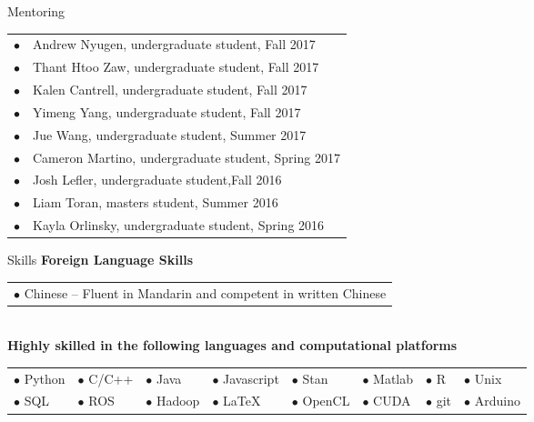 \documentclass{resume} %
\begin{document}
\begin{rSection}{Mentoring}
  \begin{tabular}{ll}
    $\bullet$  &   Andrew Nyugen, undergraduate student, Fall 2017 \\
    $\bullet$  &   Thant Htoo Zaw, undergraduate student, Fall 2017 \\
    $\bullet$  &   Kalen Cantrell, undergraduate student, Fall 2017 \\
    $\bullet$  &   Yimeng Yang, undergraduate student, Fall 2017 \\
    $\bullet$  &   Jue Wang, undergraduate student, Summer 2017 \\
    $\bullet$  &   Cameron Martino, undergraduate student, Spring 2017 \\
    $\bullet$  &   Josh Lefler, undergraduate student,Fall 2016 \\
    $\bullet$  &   Liam Toran, masters student, Summer 2016 \\
    $\bullet$  &   Kayla Orlinsky, undergraduate student, Spring 2016 \\
  \end{tabular}
\end{rSection}
\newpage
\begin{rSection}{Skills}
  \textbf{Foreign Language Skills}\\
  \begin{tabular}{l}
    $\bullet$ Chinese --  Fluent in Mandarin and competent in written Chinese\\
  \end{tabular}\\
  \textbf{Highly skilled in the following languages and computational platforms}\\
  \begin{tabular}{llllllll}
     $\bullet$ Python   &  $\bullet$ C/C++ &  $\bullet$ Java  & $\bullet$ Javascript & $\bullet$ Stan & $\bullet$ Matlab   &  $\bullet$ R     &  $\bullet$ Unix \\
     $\bullet$ SQL & $\bullet$ ROS &  $\bullet$ Hadoop &  $\bullet$ \LaTeX &  $\bullet$ OpenCL   &  $\bullet$ CUDA   &   $\bullet$ git & $\bullet$ Arduino\\
  \end{tabular}
\end{rSection}
\end{document}
